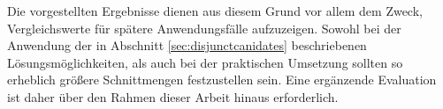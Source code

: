 Die vorgestellten Ergebnisse dienen aus diesem Grund vor allem dem Zweck, Vergleichswerte für spätere Anwendungsfälle aufzuzeigen. Sowohl bei der Anwendung der in Abschnitt \ref{sec:disjunctcanidates} beschriebenen Lösungsmöglichkeiten, als auch bei der praktischen Umsetzung sollten so erheblich größere Schnittmengen festzustellen sein. Eine ergänzende Evaluation ist daher über den Rahmen dieser Arbeit hinaus erforderlich.

